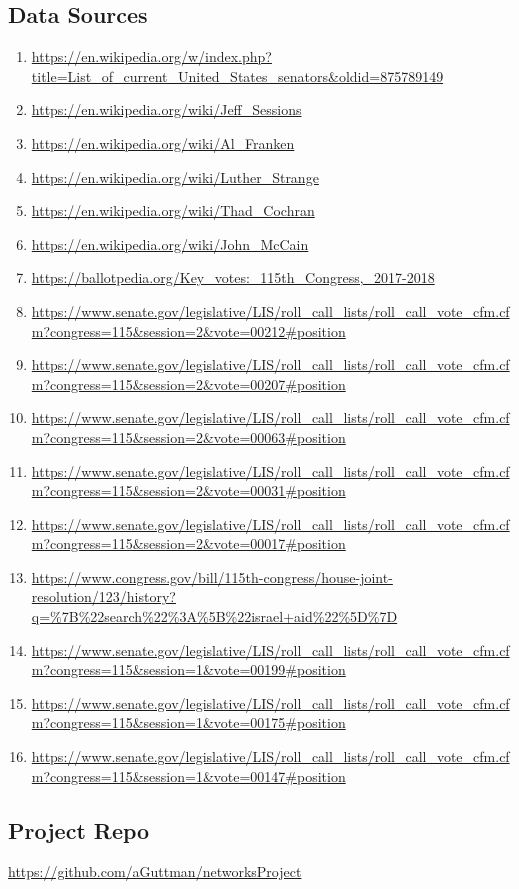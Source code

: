 \documentclass[11pt,twocolumn]{article}
\begin{document}
	\subsection{Data Sources}
	\begin{enumerate}
	\item
	\url{https://en.wikipedia.org/w/index.php?title=List_of_current_United_States_senators&oldid=875789149}
	\item\url{https://en.wikipedia.org/wiki/Jeff_Sessions}
	\item\url{https://en.wikipedia.org/wiki/Al_Franken}
	\item\url{https://en.wikipedia.org/wiki/Luther_Strange}
	\item\url{https://en.wikipedia.org/wiki/Thad_Cochran}
	\item\url{https://en.wikipedia.org/wiki/John_McCain}
	\item\url{https://ballotpedia.org/Key_votes:_115th_Congress,_2017-2018}
	\item\url{https://www.senate.gov/legislative/LIS/roll_call_lists/roll_call_vote_cfm.cfm?congress=115&session=2&vote=00212#position}
	\item\url{https://www.senate.gov/legislative/LIS/roll_call_lists/roll_call_vote_cfm.cfm?congress=115&session=2&vote=00207#position}
	\item\url{https://www.senate.gov/legislative/LIS/roll_call_lists/roll_call_vote_cfm.cfm?congress=115&session=2&vote=00063#position}
	\item\url{https://www.senate.gov/legislative/LIS/roll_call_lists/roll_call_vote_cfm.cfm?congress=115&session=2&vote=00031#position}
	\item\url{https://www.senate.gov/legislative/LIS/roll_call_lists/roll_call_vote_cfm.cfm?congress=115&session=2&vote=00017#position}
	\item\url{https://www.congress.gov/bill/115th-congress/house-joint-resolution/123/history?q=%7B%22search%22%3A%5B%22israel+aid%22%5D%7D}
	\item\url{https://www.senate.gov/legislative/LIS/roll_call_lists/roll_call_vote_cfm.cfm?congress=115&session=1&vote=00199#position}
	\item\url{https://www.senate.gov/legislative/LIS/roll_call_lists/roll_call_vote_cfm.cfm?congress=115&session=1&vote=00175#position}
	\item\url{https://www.senate.gov/legislative/LIS/roll_call_lists/roll_call_vote_cfm.cfm?congress=115&session=1&vote=00147#position}
	\end{enumerate}
	\subsection{Project Repo}
	\url{https://github.com/aGuttman/networksProject}


\end{document}
